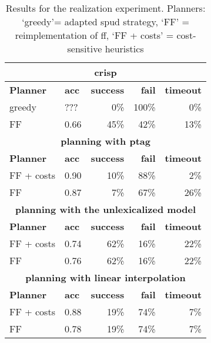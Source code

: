 \begin{table}
    \caption{\label{results} Results for the realization experiment. Planners: `greedy'= adapted {\sc spud} strategy, `FF' = reimplementation of {\sc ff}, `FF + costs' = cost-sensitive heuristics } 
    \begin{center}
    \begin{tabular}{|l||l||r|r|r|}
    \multicolumn{5}{c}{\sc crisp}\\ 
    \hline
     {\bf Planner }  & {\bf acc}& {\bf success} & {\bf fail} & {\bf timeout} \\ \hline 
     greedy         & ??? & 0\% & 100\% & 0\%  \\ \hline 
     FF         &  0.66 & 45\% & 42\% & 13\% \\ \hline 
    \multicolumn{5}{c}{\bf planning with {\sc ptag}}\\\hline
    {\bf Planner }  & {\bf acc}& {\bf success} & {\bf fail} & {\bf timeout} \\ \hline 
     FF + costs &  0.90 &  10\% &88\% & 2\% \\ \hline
     FF         &  0.87 & 7\% & 67\% &  26\% \\ \hline
    \multicolumn{5}{c}{\bf planning with the unlexicalized model}\\\hline
    {\bf Planner }  & {\bf acc}& {\bf success} & {\bf fail} & {\bf timeout} \\ \hline 
     FF + costs & 0.74 & 62\% & 16\% & 22\%\\ \hline
     FF & 0.76 & 62\% & 16\% &  22\%\\ \hline
    \multicolumn{5}{c}{\bf planning with linear interpolation}\\\hline
    {\bf Planner }  & {\bf acc}& {\bf success} & {\bf fail} & {\bf timeout} \\ \hline 
     FF + costs & 0.88 & 19\% & 74\% & 7\% \\ \hline
     FF & 0.78 & 19\% & 74\% & 7\% \\ \hline
    \end{tabular}
    \end{center}
\end{table}


